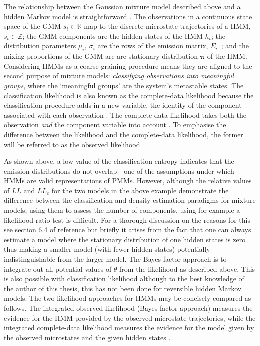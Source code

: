 The relationship between the Gaussian mixture model described above and a hidden Markov model is straightforward \cite{mclachlanFiniteMixtureModels2000}. The observations in a continuous state space of the GMM $s_{i} \in \mathbb{R}$ map to the discrete microstate trajectories of a HMM, $s_{t} \in \mathbb{Z}$; the GMM components are the hidden states of the HMM $h_{t}$; the distribution parameters $\mu_{i},\ \sigma_{i}$ are the rows of the emission matrix, $E_{i, \cdot}$; and the mixing proportions of the GMM are are stationary distribution $\bm{\pi}$ of the HMM. Considering HMMs as a coarse-graining procedure means they are aligned to the second purpose of mixture models: \emph{classifying observations into meaningful groups}, where the `meaningful groups' are the system's metastable states. The classification likelihood is also known as the complete-data likelihood because the classification procedure adds in a new variable, the identity of the component associated with each observation \cite{mclachlanFiniteMixtureModels2000}. The complete-data likelihood takes both the observation \emph{and} the component variable into account \cite{mclachlan1988mixture}. To emphasise the difference between the likelihood and the complete-data likelihood, the former will be referred to as the observed likelihood.  

As shown above, a low value of the classification entropy indicates that the emission distributions do not overlap - one of the assumptions under which HMMs are valid representations of PMMs. However, although the relative values of $LL$ and $LL_{c}$ for the two models in the above example demonstrate the difference between the classification and density estimation paradigms for mixture models, using them to assess the number of components, using for example a likelihood ratio test \cite{wasserman2013all} is difficult. For a thorough discussion on the reasons for this see section 6.4 of reference \cite{mclachlanFiniteMixtureModels2000} but briefly it arises from the fact that one can always estimate a model where the stationary distribution of one hidden states is zero thus making a smaller model (with fewer hidden states) potentially indistinguishable from the larger model. The Bayes factor approach is to integrate out all potential values of $\theta$ from the likelihood as described above. This is also possible with classification likelihood \cite{latoucheBayesianMethodsGraph2010} although to the best knowledge of the author of this thesis, this has not been done for reversible hidden Markov models. The two likelihood approaches for HMMs may be concisely compared as follows. The integrated observed likelihood (Bayes factor approach) measures the evidence for the HMM provided by the observed microstate trajectories, while the integrated complete-data likelihood measures the evidence for the model  given by the observed microstates and the given hidden states \cite{biernackiAssessingMixtureModel2000a, celeuxSelectingHiddenMarkov2008}. 

